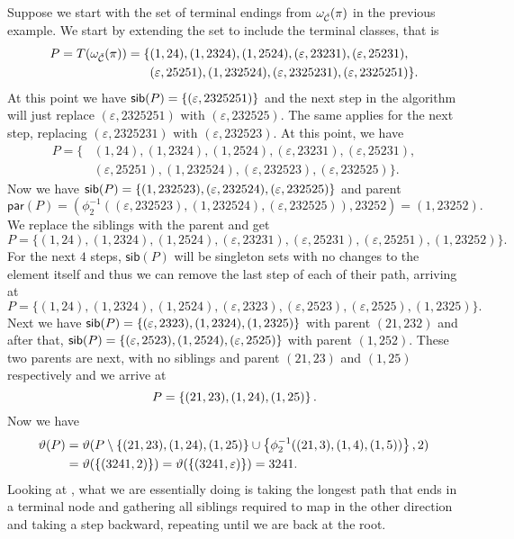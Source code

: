 Suppose we start with the set of terminal endings from $\omega_{\check{\mathcal{C}}}(\pi)$ in the previous example. We start by extending the set to include the terminal classes, that is
\begin{align*}
    P = T(\omega_{\check{\mathcal{C}}}(\pi)) = \{&(1,24), (1,2324), (1,2524), (\varepsilon,23231), (\varepsilon,25231),\\ &(\varepsilon,25251), (1,232524), (\varepsilon,2325231), (\varepsilon,2325251)\}.
\end{align*}
At this point we have $\textsf{sib}(P) = \left\{(\varepsilon,2325251)\right\}$ and the next step in the algorithm will just replace $(\varepsilon,2325251)$ with $(\varepsilon,232525)$. The same applies for the next step, replacing $(\varepsilon,2325231)$ with $(\varepsilon,232523)$. At this point, we have
\begin{align*}
    P = \{&(1,24), (1,2324), (1,2524), (\varepsilon,23231), (\varepsilon,25231),\\ &(\varepsilon,25251), (1,232524), (\varepsilon,232523), (\varepsilon,232525)\}.
\end{align*}
Now we have $\textsf{sib}(P) = \left\{(1,232523), (\varepsilon,232524), (\varepsilon,232525)\right\}$ and parent
\[
    \textsf{par}(P) = (\phi_2^{-1}((\varepsilon, 232523),(1, 232524),(\varepsilon, 232525)), 23252) = (1,23252).
\]
We replace the siblings with the parent and get
\[
    P = \{(1,24), (1,2324), (1,2524), (\varepsilon,23231), (\varepsilon,25231),(\varepsilon,25251), (1,23252)\}.
\]
For the next $4$ steps, $\textsf{sib}(P)$ will be singleton sets with no changes to the element itself and thus we can remove the last step of each of their path, arriving at
\[
    P = \{(1,24), (1,2324), (1,2524), (\varepsilon,2323), (\varepsilon,2523),(\varepsilon,2525), (1,2325)\}.
\]
Next we have $\textsf{sib}(P) = \left\{(\varepsilon, 2323), (1, 2324), (1,2325)\right\}$ with parent $(21,232)$ and after that, $\textsf{sib}(P) = \left\{(\varepsilon, 2523), (1, 2524), (\varepsilon,2525)\right\}$ with parent $(1,252)$. These two parents are next, with no siblings and parent $(21,23)$ and $(1,25)$ respectively and we arrive at 
\[
    P = \left\{(21,23),(1,24),(1,25)\right\}.
\]
Now we have
\begin{align*}
    \vartheta(P) &= \vartheta(P \setminus \left\{(21,23),(1,24),(1,25)\right\} \cup \left\{\phi_2^{-1}((21,3),(1,4),(1,5))\right\}, 2)\\
    &= \vartheta(\left\{(3241,2)\right\}) = \vartheta(\left\{(3241,\varepsilon)\right\}) = 3241.
\end{align*}
Looking at , what we are essentially doing is taking the longest path that ends in a terminal node and gathering all siblings required to map in the other direction and taking a step backward, repeating until we are back at the root.

